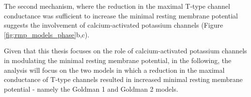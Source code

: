 \documentclass[../main.tex]{subfiles}
\begin{document}
The second mechanism, where the reduction in the maximal T-type channel conductance was sufficient to increase the minimal resting membrane potential suggests the involvement of calcium-activated potassium channels (Figure \ref{fig:rmp_models_phase}b,c).

Given that this thesis focuses on the role of calcium-activated potassium channels in modulating the minimal resting membrane potential, in the following, the analysis will focus on the two models in which a reduction in the maximal conductance of T-type channels resulted in increased minimal resting membrane potential - namely the Goldman 1 and Goldman 2 models.

\end{document}
